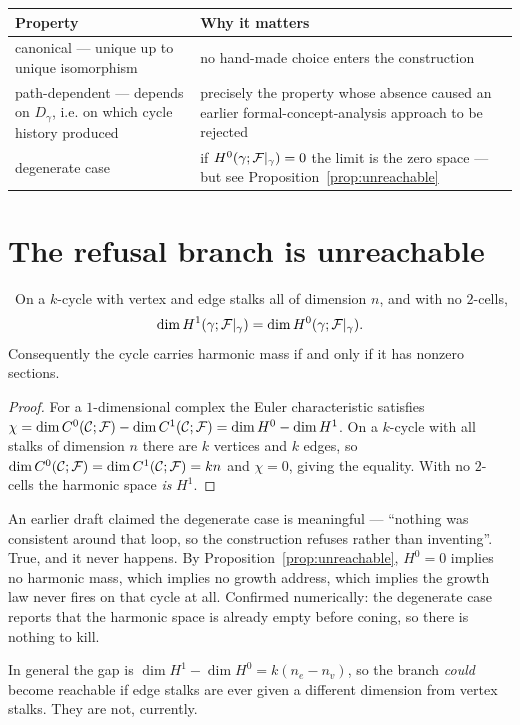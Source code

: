 \begin{center}
\begin{tabular}{@{}p{3.4cm}p{8.4cm}@{}}
\toprule
\textbf{Property} & \textbf{Why it matters}\\
\midrule
canonical --- unique up to unique isomorphism & no hand-made choice
enters the construction\\
path-dependent --- depends on $D_\gamma$, i.e. on which cycle history
produced & precisely the property whose absence caused an earlier
formal-concept-analysis approach to be rejected\\
degenerate case & if $H^0(\gamma;\mathcal{F}|_\gamma)=0$ the limit is the zero
space --- but see Proposition~\ref{prop:unreachable}\\
\bottomrule
\end{tabular}
\end{center}

\section{The refusal branch is unreachable}

\begin{proposition}\label{prop:unreachable}
\Proved\ On a $k$-cycle with vertex and edge stalks all of dimension
$n$, and with no $2$-cells,
\[
  \dim H^1(\gamma;\mathcal{F}|_\gamma)=\dim H^0(\gamma;\mathcal{F}|_\gamma).
\]
Consequently the cycle carries harmonic mass if and only if it has
nonzero sections.
\end{proposition}
\begin{proof}
For a $1$-dimensional complex the Euler characteristic satisfies
$\chi=\dim C^{0}(\mathcal{C};\mathcal{F})-\dim C^{1}(\mathcal{C};\mathcal{F})=\dim H^0-\dim H^1$. On a $k$-cycle with all
stalks of dimension $n$ there are $k$ vertices and $k$ edges, so
$\dim C^{0}(\mathcal{C};\mathcal{F})=\dim C^{1}(\mathcal{C};\mathcal{F})=kn$ and $\chi=0$, giving the equality. With no
$2$-cells the harmonic space \emph{is} $H^1$.
\end{proof}

\begin{hon}\Hon
An earlier draft claimed the degenerate case is meaningful --- ``nothing
was consistent around that loop, so the construction refuses rather than
inventing''. True, and it never happens. By
Proposition~\ref{prop:unreachable}, $H^0=0$ implies no harmonic mass,
which implies no growth address, which implies the growth law never
fires on that cycle at all. Confirmed numerically: the degenerate case
reports that the harmonic space is already empty before coning, so there
is nothing to kill.

In general the gap is $\dim H^1-\dim H^0=k(n_e-n_v)$, so the branch
\emph{could} become reachable if edge stalks are ever given a different
dimension from vertex stalks. They are not, currently.
\end{hon}

